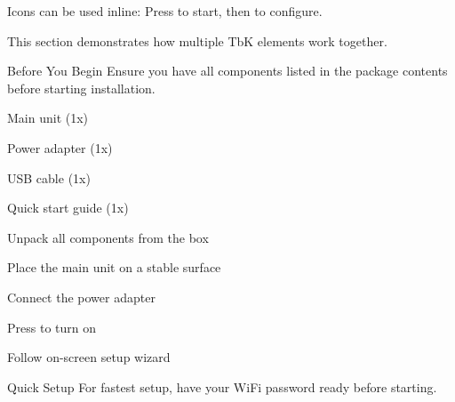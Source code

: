 \documentclass[11pt,a4paper]{article}
\begin{document}

Icons can be used inline: Press  to start, then  to configure.


\clearpage
{}

This section demonstrates how multiple TbK elements work together.


\begin{tbkWarning}{Before You Begin}
Ensure you have all components listed in the package contents before starting installation.
\end{tbkWarning}


\begin{tbkChecklist}
  \item[pending] Main unit (1x)
  \item[pending] Power adapter (1x)
  \item[pending] USB cable (1x)
  \item[pending] Quick start guide (1x)
\end{tbkChecklist}


\begin{tbkNumberedList}
  \item Unpack all components from the box
  \item Place the main unit on a stable surface
  \item Connect the power adapter
  \item Press  to turn on
  \item Follow on-screen setup wizard
\end{tbkNumberedList}

\begin{tbkTip}{Quick Setup}
For fastest setup, have your WiFi password ready before starting.
\end{tbkTip}


\begin{tbkSpecTable}[caption={Connection Specifications}]
\end{tbkSpecTable}
\end{document}

